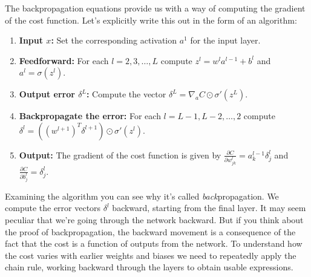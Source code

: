 

The backpropagation equations provide us with a way of computing the gradient of the cost function. Let's explicitly write this out in the form of an algorithm:



\begin{enumerate}

\item \textbf{Input $x$:} Set the corresponding activation $a^{1}$ for the input layer.

\item \textbf{Feedforward:} For each $l = 2, 3, \ldots, L$ compute $z^{l} = w^l a^{l-1}+b^l$ and $a^{l} = \sigma(z^{l})$.

\item \textbf{Output error $\delta^L$:} Compute the vector $\delta^{L} = \nabla_a C \odot \sigma'(z^L)$.

\item \textbf{Backpropagate the error:} For each $l = L-1, L-2, \ldots, 2$ compute $\delta^{l} = ((w^{l+1})^T \delta^{l+1}) \odot \sigma'(z^{l})$.

\item \textbf{Output:} The gradient of the cost function is given by $\frac{\partial C}{\partial w^l_{jk}} = a^{l-1}_k \delta^l_j$ and $\frac{\partial C}{\partial b^l_j} = \delta^l_j$.

\end{enumerate}


Examining the algorithm you can see why it's called \emph{back}propagation. We compute the error vectors $\delta^l$ backward, starting from the final layer. It may seem peculiar that we're going through the network backward. But if you think about the proof of backpropagation, the backward movement is a consequence of the fact that the cost is a function of outputs from the network. To understand how the cost varies with earlier weights and biases we need to repeatedly apply the chain rule, working backward through the layers to obtain usable expressions.



